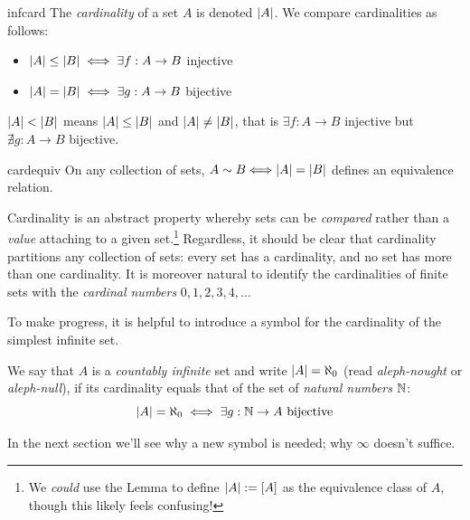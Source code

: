 \begin{defn}{}{infcard}
	The \emph{cardinality} of a set $A$ is denoted $\left| A\right|$. We compare cardinalities as follows:
	\begin{itemize}
  	\item $\left| A\right|\le\left| B\right|\iff\exists f:A\to B$ injective
  	\item $\left| A\right|=\left| B\right|\iff\exists g:A\to B$ bijective
	\end{itemize}
	$\left| A\right|<\left| B\right|$ means $\left| A\right|\le \left| B\right|$ and $\left| A\right|\neq \left| B\right|$, that is $\exists f:A\to B$ injective but $\nexists g:A\to B$ bijective.
\end{defn}

\begin{lemm}{}{cardequiv}
	On any collection of sets, $A\sim B\Longleftrightarrow \left| A\right|=\left| B\right|$ defines an equivalence relation.
\end{lemm}

Cardinality is an abstract property whereby sets can be \emph{compared} rather than a \emph{value} attaching to a given set.\footnote{We \emph{could} use the Lemma to define $\left| A\right|:=[A]$ as the equivalence class of $A$, though this likely feels confusing!} Regardless, it should be clear that cardinality partitions any collection of sets: every set has a cardinality, and no set has more than one cardinality. It is moreover natural to identify the cardinalities of finite sets with the \emph{cardinal numbers} $0,1,2,3,4,\ldots$

\goodbreak





To make progress, it is helpful to introduce a symbol for the cardinality of the simplest infinite set.

\begin{defn}{}{}
	We say that $A$ is a \emph{countably infinite\footnotemark} set and write $\left| A\right|=\aleph_0$ (read \emph{aleph-nought} or \emph{aleph-null}), if its cardinality equals that of the set of \emph{natural numbers} $\mathbb{N}$:
	\[
		\left| A\right|=\aleph_0 \iff \exists g:\mathbb{N}\to A\text{ bijective}
	\]
\end{defn}


In the next section we'll see why a new symbol is needed; why $\infty$ doesn't suffice.

